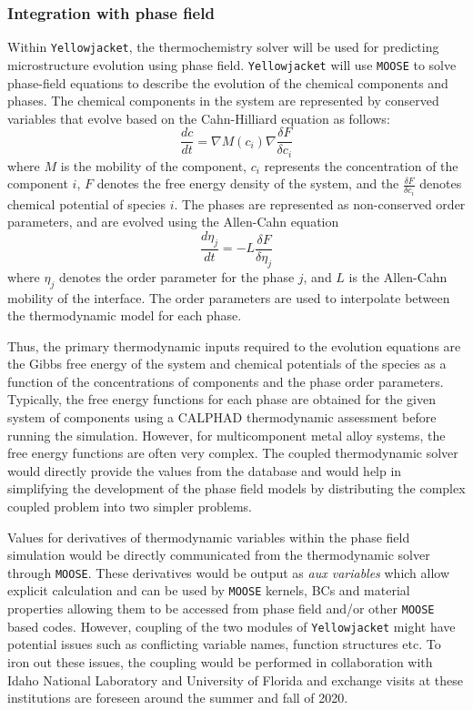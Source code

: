 	\subsubsection{Integration with phase field}
	Within \texttt{Yellowjacket}, the thermochemistry solver will be used for predicting microstructure evolution using phase field. \texttt{Yellowjacket} will use \texttt{MOOSE} to solve phase-field equations to describe the evolution of the chemical components and phases. The chemical components in the system are represented by conserved variables that evolve based on the Cahn-Hilliard equation as follows:
        \begin{equation}
            \frac{dc}{dt} = \nabla M\left(c_i\right) \nabla\frac{\delta F}{\delta c_i}
        \end{equation}
        where $M$ is the mobility of the component, $c_i$ represents the concentration of the component $i$, $F$ denotes the free energy density of the system, and the $\tfrac{\delta F}{\delta c_i}$ denotes chemical potential of species $i$. The phases are represented as non-conserved order parameters, and are evolved using the Allen-Cahn equation
        \begin{equation}
            \frac{d\eta_j}{dt} = -L \frac{\delta F}{\delta \eta_j}
        \end{equation}
        where $\eta_j$ denotes the order parameter for the phase $j$, and $L$ is the Allen-Cahn mobility of the interface. The order parameters are used to interpolate between the thermodynamic model for each phase.

        Thus, the primary thermodynamic inputs required to the evolution equations are the Gibbs free energy of the system and chemical potentials of the species as a function of the concentrations of components and the phase order parameters. Typically, the free energy functions for each phase are obtained for the given system of components using a CALPHAD thermodynamic assessment before running the simulation. However, for multicomponent metal alloy systems, the free energy functions are often very complex. The coupled thermodynamic solver would directly provide the values from the database and would help in simplifying the development of the phase field models by distributing the complex coupled problem into two simpler problems.

        Values for derivatives of thermodynamic variables within the phase field simulation would be directly communicated from the thermodynamic solver through \texttt{MOOSE}. These derivatives would be output as \emph{aux variables} which allow explicit calculation and can be used by \texttt{MOOSE} kernels, BCs and material properties allowing them to be accessed from phase field and/or other \texttt{MOOSE} based codes. However, coupling of the two modules of \texttt{Yellowjacket} might have potential issues such as conflicting variable names, function structures etc. To iron out these issues, the coupling would be performed in collaboration with Idaho National Laboratory and University of Florida and exchange visits at these institutions are foreseen around the summer and fall of 2020.

